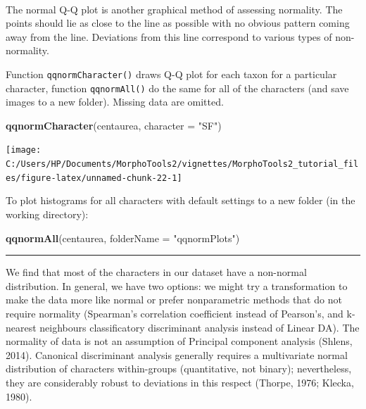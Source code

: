 \documentclass[
]{article}
\newenvironment{Shaded}{\begin{snugshade}}{\end{snugshade}}
\newcommand{\DataTypeTok}[1]{\textcolor[rgb]{0.13,0.29,0.53}{#1}}
\newcommand{\KeywordTok}[1]{\textcolor[rgb]{0.13,0.29,0.53}{\textbf{#1}}}
\newcommand{\NormalTok}[1]{#1}
\newcommand{\StringTok}[1]{\textcolor[rgb]{0.31,0.60,0.02}{#1}}
\begin{document}
~

The normal Q-Q plot is another graphical method of assessing normality.
The points should lie as close to the line as possible with no obvious
pattern coming away from the line. Deviations from this line correspond
to various types of non-normality.

Function \texttt{qqnormCharacter()} draws Q-Q plot for each taxon for a
particular character, function \texttt{qqnormAll()} do the same for all
of the characters (and save images to a new folder). Missing data are
omitted.

\begin{Shaded}
\begin{Highlighting}[]
\KeywordTok{qqnormCharacter}\NormalTok{(centaurea, }\DataTypeTok{character =} \StringTok{"SF"}\NormalTok{)}
\end{Highlighting}
\end{Shaded}

\begin{center}\texttt{[image: C:/Users/HP/Documents/MorphoTools2/vignettes/MorphoTools2\_tutorial\_files/figure-latex/unnamed-chunk-22-1]} \end{center}

To plot histograms for all characters with default settings to a new
folder (in the working directory):

\begin{Shaded}
\begin{Highlighting}[]
\KeywordTok{qqnormAll}\NormalTok{(centaurea, }\DataTypeTok{folderName =} \StringTok{"qqnormPlots"}\NormalTok{)}
\end{Highlighting}
\end{Shaded}

\begin{center}\rule{0.5\linewidth}{0.5pt}\end{center}

We find that most of the characters in our dataset have a non-normal
distribution. In general, we have two options: we might try a
transformation to make the data more like normal or prefer nonparametric
methods that do not require normality (Spearman's correlation
coefficient instead of Pearson's, and k-nearest neighbours
classificatory discriminant analysis instead of Linear DA). The
normality of data is not an assumption of Principal component analysis
(Shlens, 2014). Canonical discriminant analysis generally requires a
multivariate normal distribution of characters within-groups
(quantitative, not binary); nevertheless, they are considerably robust
to deviations in this respect (Thorpe, 1976; Klecka, 1980).
\end{document}
